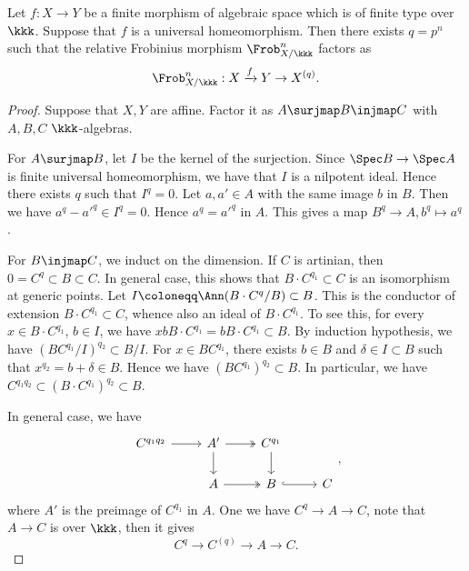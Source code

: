     \begin{lemma}\label{lem:relative_frob_factors_through_universal_homeomorphism}
        Let \(f: X \to Y\) be a finite morphism of algebraic space which is of finite type over \(\kkk\).
        Suppose that \(f\) is a universal homeomorphism.
        Then there exists \(q= p^n\) such that the relative Frobinius morphism \(\Frob_{X/\kkk}^n\) factors as 
        \[ \Frob_{X/\kkk}^n: X \xrightarrow{f} Y \to X^{(q)}. \]
    \end{lemma}
    \begin{proof}
        Suppose that \(X,Y\) are affine.
        Factor it as \(A \surjmap B \injmap C\) with \(A,B,C\) \(\kkk\)-algebras.

        For \(A \surjmap B\), let \(I\) be the kernel of the surjection.
        Since \(\Spec B \to \Spec A\) is finite universal homeomorphism, we have that \(I\) is a nilpotent ideal.
        Hence there exists \(q\) such that \(I^q = 0\).
        Let \(a,a' \in A\) with the same image \(b\) in \(B\).
        Then we have \(a^q - a'^q \in I^q = 0\).
        Hence \(a^q = a'^q\) in \(A\).
        This gives a map \(B^{q} \to A, b^q \mapsto a^q\).

        For \(B \injmap C\), we induct on the dimension.
        If \(C\) is artinian, then \(0 = C^q \subset B \subset C\).
        In general case, this shows that \(B \cdot C^{q_1} \subset C\) is an isomorphism at generic points.
        Let \(I \coloneqq \Ann(B \cdot C^q/B) \subset B\).
        This is the conductor of extension \(B \cdot C^{q_1} \subset C\), whence also an ideal of \(B \cdot C^{q_1}\).
        To see this, for every \(x \in B \cdot C^{q_1}\), \(b \in I\), we have \(x b B \cdot C^{q_1} = bB \cdot C^{q_1} \subset B\).
        By induction hypothesis, we have \((BC^{q_1}/I)^{q_2} \subset B/I\).
        For \(x \in BC^{q_1}\), there exists \(b \in B\) and \(\delta \in I \subset B\) such that \(x^{q_2} = b + \delta \in B\).
        Hence we have \((BC^{q_1})^{q_2} \subset B\).
        In particular, we have \(C^{q_1 q_2} \subset (B \cdot C^{q_1})^{q_2} \subset B\).

        In general case, we have 
        \[ \begin{tikzcd}
            C^{q_1 q_2} \arrow[r] & A' \arrow[r, two heads] \arrow[d] & C^{q_1} \arrow[d] \\
            & A \arrow[r, two heads] & B \arrow[r, hook] & C
        \end{tikzcd}, \]
        where \(A'\) is the preimage of \(C^{q_1}\) in \(A\).
        One we have \(C^q \to A \to C\), note that \(A\to C\) is over \(\kkk\), then it gives 
        \[ C^q \to C^{(q)} \to A \to C. \]
    \end{proof}

